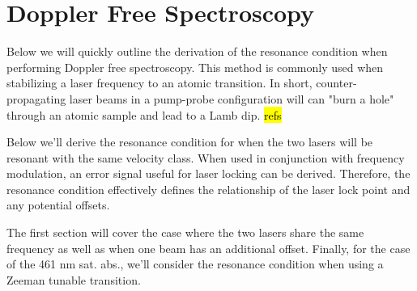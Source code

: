 \chapter{Doppler Free Spectroscopy} \label{ch:dopSpec}
Below we will quickly outline the derivation of the resonance condition when performing Doppler free spectroscopy.
This method is commonly used when stabilizing a laser frequency to an atomic transition.
In short, counter-propagating laser beams in a pump-probe configuration will can "burn a hole" through an atomic sample and lead to a Lamb dip. \hl{refs}

Below we'll derive the resonance condition for when the two lasers will be resonant with the same velocity class.
When used in conjunction with frequency modulation, an error signal useful for laser locking can be derived.
Therefore, the resonance condition effectively defines the relationship of the laser lock point and any potential offsets.

The first section will cover the case where the two lasers share the same frequency as well as when one beam has an additional offset.
Finally, for the case of the 461 nm sat. abs., we'll consider the resonance condition when using a Zeeman tunable transition. 

